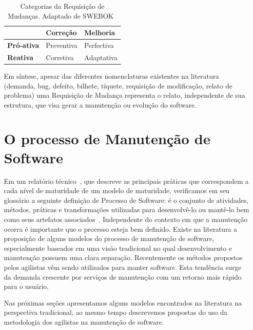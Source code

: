 \begin{table}[htpb] \centering 	\begin{tabular}{l|l|l|} \cline{2-3} &
		\textbf{Correção} & \textbf{Melhoria} \\ \hline
		\multicolumn{1}{|l|}{\textbf{Pró-ativa}} & Preventiva & Perfectiva \\
		\hline \multicolumn{1}{|l|}{\textbf{Reativa}} & Corretiva & Adaptativa
		\\ \hline \end{tabular}\caption{Categorias da Requisição de Mudanças.
		Adaptado de
		SWEBOK~\cite{4425813}}\label{tab:categorias_requisicao_mudanca}
\end{table}

Em síntese, apesar das diferentes nomenclaturas existentes na literatura
(demanda, bug, defeito, bilhete, tíquete, requisição de modificação, relato de
problema) uma Requisição de Mudança representa o relato, independente de sua
estrutura, que visa gerar a manutenção ou evolução do software.

\section{O processo de Manutenção de Software}
\label{sec:o_processo_de_manutecao_de_software}

Em um relatório técnico~\cite{paulk1993key}, que descreve as principais práticas que
correspondem a cada nível de maturidade de um modelo de maturidade, verificamos
em seu glossário a seguinte definição de Processo de Software: é o conjunto de
atividades, métodos, práticas e transformações utilizadas para desenvolvê-lo ou
mantê-lo bem como seus artefatos associados~\cite{paulk1993key}. Independente do
contexto em que a manutenção ocorra é importante que o processo esteja bem
definido. Existe na literatura a proposição de alguns modelos do processo de
manutenção de software, especialmente baseados em uma visão tradicional no qual
desenvolvimento e manutenção possuem uma clara separação. Recentemente os
métodos propostos pelos agilistas vêm sendo utilizados para manter software.
Esta tendência surge da demanda crescente por serviços de manutenção com um
retorno mais rápido para o usuário.
\todoend

Nas próximas seções apresentamos alguns modelos encontrados na literatura na
perspectiva tradicional, ao mesmo tempo descrevemos propostas do uso da
metodologia dos agilistas na manutenção de software.

